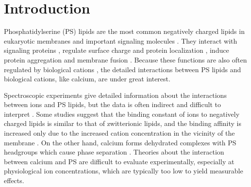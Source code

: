 \documentclass[journal=jpcbfk,manuscript=article]{achemso}
\begin{document}
 
 
 
 
 
 
\section{Introduction} 

Phosphatidylserine (PS) lipids are the most common negatively charged lipids in eukaryotic membranes
and important signaling molecules \cite{lemmon08,leventis10,li14}.
They interact with signaling proteins \cite{leventis10},
regulate surface charge and protein localization \cite{yeung08}, 
induce protein aggregation \cite{zhao04,gorbenko06} and membrane fusion \cite{??}.
Because these functions are also often regulated by biological cations \cite{leventis10},
the detailed interactions between PS lipids and biological cations, like calcium, are under great interest.

Spectroscopic experiments give detailed information about the
interactions between ions and PS lipids, but the data is often indirect and difficult to
interpret \cite{hauser77,kurland79,eisenberg79,hauser83,dluhy83,hauser85,feigenson86,mattai89,roux90,roux91}.
Some studies suggest that the
binding constant of ions to negatively charged lipids is similar to that of zwitterionic lipids,
and the binding affinity is increased only due to the increased cation
concentration in the vicinity of the membrane \cite{seelig90,sinn06}.
On the other hand, calcium forms dehydrated complexes with PS headgroups
which cause phase separation \cite{hauser77,kurland79,hauser85,feigenson86,mattai89,roux90,roux91,boettcher11}.
Theories about the interaction between calcium and PS 
are difficult to evaluate experimentally,
especially at physiological ion concentrations,
which are typically too low to yield measurable effects.
\end{document}
